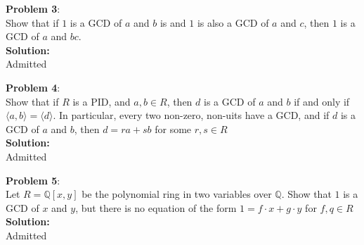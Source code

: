 \documentclass[11pt]{article}
\newcommand{\prob}[3]{\begin{flushleft}
        \textbf{Problem #1}: \\
        #2 
		\textbf{Solution:} 
		#3

\end{flushleft}}
\begin{document}
\prob{3}{
  Show that if $1$ is a GCD of $a$ and $b$ is and $1$ is also a GCD of $a$ and $c$, then $1$ is a GCD of $a$ and $bc$. \\
}{ \\
  Admitted
}

\prob{4}{
  Show that if $R$ is a PID, and $a, b \in R$, then $d$ is a GCD of $a$ and $b$ if and only if $\langle a, b \rangle = \langle d \rangle$.
  In particular, every two non-zero, non-uits have a GCD, and if $d$ is a GCD of $a$ and $b$, then $d = ra + sb$ for some $r, s \in R$ \\
}{ \\
  Admitted
}

\prob{5}{
  Let $R = \mathbb{Q}[x,y]$ be the polynomial ring in two variables over $\mathbb{Q}$. Show that $1$ is a GCD of $x$ and $y$,
  but there is no equation of the form $1 = f \cdot x + g \cdot y$ for $f, q \in R$ \\
}{ \\
  Admitted
}
\end{document}
